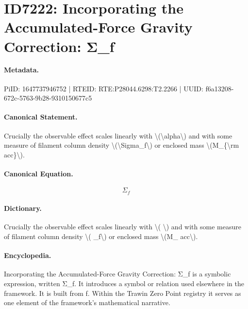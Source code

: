 \section*{ID7222: Incorporating the Accumulated-Force Gravity Correction: Σ\_f}
\paragraph{Metadata.}
PiID: 1647737946752 | RTEID: RTE:P28044.6298:T2.2266 | UUID: f6a13208-672c-5763-9b28-9310150677c5

\paragraph{Canonical Statement.}
Crucially the observable effect scales linearly with \textbackslash{}(\textbackslash{}alpha\textbackslash{}) and with some measure of filament column density \textbackslash{}(\textbackslash{}Sigma\_f\textbackslash{}) or enclosed mass \textbackslash{}(M\_\{\textbackslash{}rm acc\}\textbackslash{}).

\paragraph{Canonical Equation.}
\[
\Sigma_f
\]

\paragraph{Dictionary.}
Crucially the observable effect scales linearly with \textbackslash{}( \textbackslash{}) and with some measure of filament column density \textbackslash{}( \_f\textbackslash{}) or enclosed mass \textbackslash{}(M\_ acc\textbackslash{}).

\paragraph{Encyclopedia.}
Incorporating the Accumulated-Force Gravity Correction: Σ\_f is a symbolic expression, written Σ\_f. It introduces a symbol or relation used elsewhere in the framework. It is built from f. Within the Trawin Zero Point registry it serves as one element of the framework's mathematical narrative.

